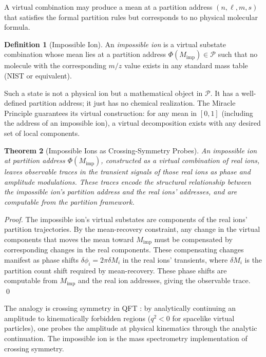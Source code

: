 \documentclass[twocolumn,10pt,a4paper]{article}
\theoremstyle{thmstyle}
\newtheorem{theorem}{Theorem}[section]
\theoremstyle{definition}
\newtheorem{definition}[theorem]{Definition}
\theoremstyle{remark}
\newcommand{\Parts}{\mathcal{P}}
\newcommand{\PhiMap}{\varPhi}
\begin{document}
A virtual combination may produce a mean at a partition address
$(n, \ell, m, s)$ that satisfies the formal partition rules but
corresponds to no physical molecular formula.

\begin{definition}[Impossible Ion]
\label{def:impossible}
An \emph{impossible ion} is a virtual substate combination whose
mean lies at a partition address $\PhiMap(M_{\text{imp}}) \in \Parts$
such that no molecule with the corresponding $m/z$ value exists in any
standard mass table (NIST or equivalent).
\end{definition}

Such a state is not a physical ion but a mathematical object in $\Parts$.
It has a well-defined partition address; it just has no chemical
realization. The Miracle Principle guarantees its virtual construction:
for any mean in $[0,1]$ (including the address of an impossible ion),
a virtual decomposition exists with any desired set of local components.

\begin{theorem}[Impossible Ions as Crossing-Symmetry Probes]
\label{thm:crossing}
An impossible ion at partition address $\PhiMap(M_{\text{imp}})$, constructed
as a virtual combination of real ions, leaves observable traces in the
transient signals of those real ions as phase and amplitude modulations.
These traces encode the structural relationship between the impossible ion's
partition address and the real ions' addresses, and are computable from
the partition framework.
\end{theorem}

\begin{proof}
The impossible ion's virtual substates are components of the real ions'
partition trajectories. By the mean-recovery constraint, any change in
the virtual components that moves the mean toward $M_{\text{imp}}$
must be compensated by corresponding changes in the real components.
These compensating changes manifest as phase shifts $\delta\phi_i =
2\pi\delta M_i$ in the real ions' transients, where $\delta M_i$ is
the partition count shift required by mean-recovery. These phase shifts
are computable from $M_{\text{imp}}$ and the real ion addresses,
giving the observable trace. \qed
\end{proof}

The analogy is crossing symmetry in QFT \citep{peskin1995}: by
analytically continuing an amplitude to kinematically forbidden regions
($q^2 < 0$ for spacelike virtual particles), one probes the amplitude
at physical kinematics through the analytic continuation. The impossible
ion is the mass spectrometry implementation of crossing symmetry.
\end{document}
